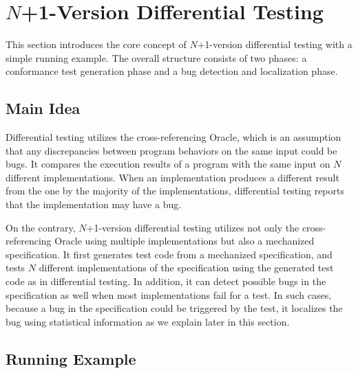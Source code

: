 \section{$N$+1-Version Differential Testing}\label{sec:idea}
This section introduces the core concept of $N$+1-version differential testing with a
simple running example.  The overall structure consists of two
phases: a conformance test generation phase and a bug detection and localization
phase.

\subsection{Main Idea}

Differential testing utilizes the cross-referencing Oracle, which is
an assumption that any discrepancies between program behaviors on the same input
could be bugs.  It compares the execution results of a program with the same
input on $N$ different implementations.  When an implementation produces a different
result from the one by the majority of the implementations, differential testing
reports that the implementation may have a bug.

On the contrary, $N$+1-version differential testing utilizes not only the cross-referencing Oracle
using multiple implementations but also a mechanized specification.  It first
generates test code from a mechanized specification, and tests 
$N$ different implementations of the specification using the generated test code
as in differential testing.  In addition, it can detect possible bugs in the specification
as well when most implementations fail for a test.  In such cases,
because a bug in the specification could be triggered by the test, it
localizes the bug using statistical information as we explain later in this section.


\subsection{Running Example}

